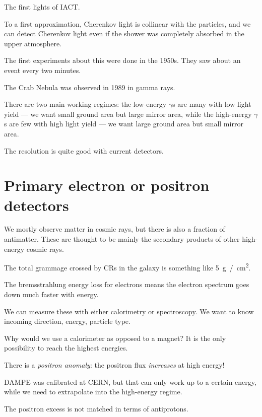 \documentclass[main.tex]{subfiles}
\begin{document}

The first lights of IACT. 

To a first approximation, Cherenkov light is collinear with the particles,
and we can detect Cherenkov light even if the shower was completely 
absorbed in the upper atmosphere. 

The first experiments about this were done in the 1950s. 
They saw about an event every two minutes. 

The Crab Nebula was observed in 1989 in gamma rays. 

There are two main working regimes: 
the low-energy \(\gamma \)s are many with low light yield --- we want small ground area but large mirror area, while 
the high-energy \(\gamma \)s are few with high light yield --- we want large ground area but small mirror area.

The resolution is quite good with current detectors. 

\section{Primary electron or positron detectors}

We mostly observe matter in cosmic rays, but 
there is also a fraction of antimatter. 
These are thought to be mainly the secondary
products of other high-energy cosmic rays. 

The total grammage crossed by CRs in the galaxy is something like \SI{5}{g / cm^2}.

The bremsstrahlung energy loss for electrons means the electron spectrum goes down much faster with energy. 

We can measure these with either calorimetry or spectroscopy. 
We want to know incoming direction, energy, particle type. 

Why would we use a calorimeter as opposed to a magnet? 
It is the only possibility to reach the highest energies. 

There is a \emph{positron anomaly}: the positron flux \emph{increases} at high energy! 

DAMPE was calibrated at CERN, but that can only work up to a certain 
energy, while we need to extrapolate into the high-energy regime.

The positron excess is not matched in terms of antiprotons. 
\end{document}
